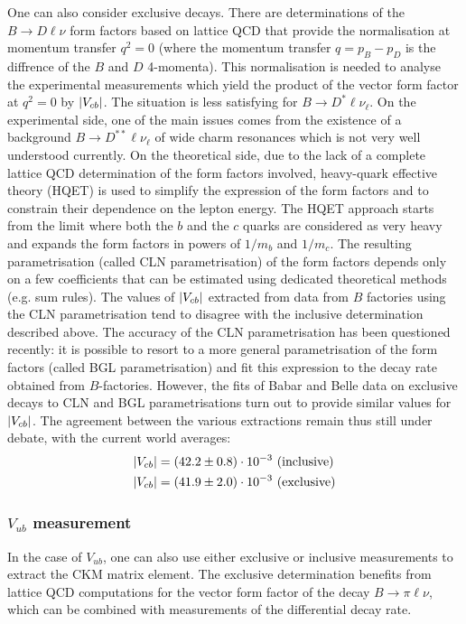 \documentclass[../../main/main.tex]{subfiles}
\begin{document}
One can also consider exclusive decays. There are determinations of the \( B \rightarrow D \ell \nu \) form factors based on lattice QCD that provide the normalisation at momentum transfer \( q^2=0 \) (where the momentum transfer \( q = p_B - p_D \) is the diffrence of the \( B \) and \( D \) 4-momenta). This normalisation is needed to analyse the experimental measurements which yield the product of the vector form factor at \( q^2 = 0 \) by \( \abs{V_{cb}} \).
The situation is less satisfying for \( B \rightarrow D^* \ell \nu_{\ell} \). On the experimental side, one of the main issues comes from the existence of a background \( B \rightarrow D^{**} \ell \nu_{\ell} \) of wide charm resonances which is not very well understood currently. On the theoretical side, due to the lack of a complete lattice QCD determination of the form factors involved, heavy-quark effective theory (HQET) is used to simplify the expression of the form factors and to constrain their dependence on the lepton energy. The HQET approach starts from the limit where both the \( b \) and the \( c \) quarks are considered as very heavy and expands the form factors in powers of \( 1/m_b \) and \( 1/m_c \). The resulting parametrisation (called CLN parametrisation) of the form factors depends only on a few coefficients that can be estimated using dedicated theoretical methods (e.g. sum rules).
The values of \( \abs{V_{cb}} \) extracted from data from \( B \) factories using the CLN parametrisation tend to disagree with the inclusive determination described above. The accuracy of the CLN parametrisation has been questioned recently: it is possible to resort to a more general parametrisation of the form factors (called BGL parametrisation) and fit this expression to the decay rate obtained from \( B \)-factories. However, the fits of Babar and Belle data on exclusive decays to CLN and BGL parametrisations turn out to provide similar values for \( \abs{V_{cb}} \). The agreement between the various extractions remain thus still under debate, with the current world averages:
\begin{align}
	\abs{V_{cb}} &= (42.2 \pm 0.8) \cdot 10^{-3} \ \text{(inclusive)}	\\
	\abs{V_{cb}} &= (41.9 \pm 2.0) \cdot 10^{-3} \ \text{(exclusive)}
\end{align}


\subsubsection*{\( V_{ub} \) measurement}
In the case of \( V_{ub} \), one can also use either exclusive or inclusive measurements to extract the CKM matrix element. The exclusive determination benefits from lattice QCD computations for the vector form factor of the decay \( B \rightarrow \pi \ell \nu \), which can be combined with measurements of the differential decay rate.
\end{document}
